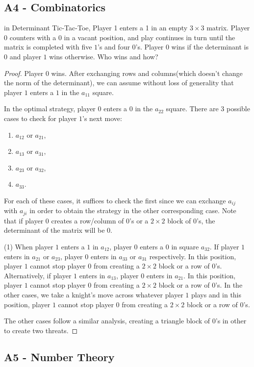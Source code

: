 \documentclass[11pt]{scrartcl}
\newcommand{\<}{\langle}
\renewcommand{\>}{\rangle}
\begin{document}
\subsection{A4 - Combinatorics}
in Determinant Tic-Tac-Toe, Player 1 enters a 1 in an empty $3 \times 3$ matrix.  Player $0$ counters with a $0$ in a vacant position, and play continues in turn until the matrix is completed with five $1$'s and four $0$'s.  Player $0$ wins if the determinant is $0$ and player $1$ wins otherwise.  Who wins and how?
\begin{proof}
Player $0$ wins.  After exchanging rows and columns(which doesn't change the norm of the determinant), we can assume without loss of generality that player $1$ enters a $1$ in the $a_{11}$ square.  

In the optimal strategy, player $0$ enters a $0$ in the $a_{22}$ square.  There are 3 possible cases to check for player $1$'s next move:
\begin{enumerate}
\item $a_{12}$ or $a_{21}$,
\item $a_{13}$ or $a_{31}$,
\item $a_{23}$ or $a_{32}$,
\item $a_{33}$.
\end{enumerate}
For each of these cases, it suffices to check the first since we can exchange $a_{ij}$ with $a_{ji}$ in order to obtain the strategy in the other corresponding case.  Note that if player $0$ creates a row/column of $0$'s or a $2 \times 2$ block of $0$'s, the determinant of the matrix will be $0$.

(1) When player $1$ enters a $1$ in $a_{12}$, player $0$ enters a $0$ in square $a_{32}$. If player $1$ enters in $a_{21}$ or $a_{23}$, player $0$ enters in $a_{33}$ or $a_{31}$ respectively. In this position, player $1$ cannot stop player $0$ from creating a $2 \times 2$ block or a row of $0$'s.   Alternatively, if player $1$ enters in $a_{13}$, player $0$ enters in $a_{21}$.  In this position, player $1$ cannot stop player $0$ from creating a $2 \times 2$ block or a row of $0$'s.  In the other cases, we take a knight's move across whatever player $1$ plays and in this position, player $1$ cannot stop player $0$ from creating a $2 \times 2$ block or a row of $0$'s.

The other cases follow a similar analysis, creating a triangle block of $0$'s in other to create two threats.  
\end{proof} 
\pagebreak
\subsection{A5 - Number Theory}
\end{document}
